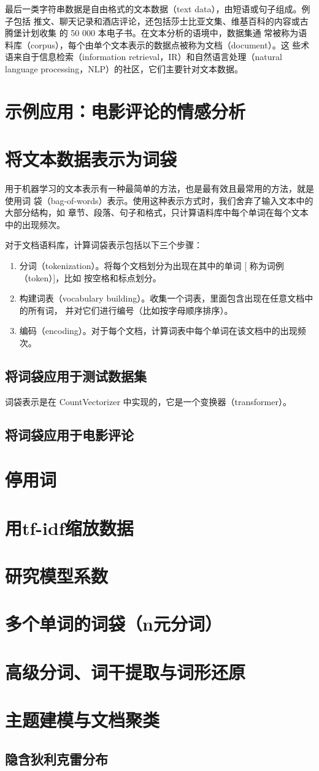最后一类字符串数据是自由格式的文本数据（text data），由短语或句子组成。例子包括
推文、聊天记录和酒店评论，还包括莎士比亚文集、维基百科的内容或古腾堡计划收集
的 50 000 本电子书。在文本分析的语境中，数据集通
常被称为语料库（corpus），每个由单个文本表示的数据点被称为文档（document）。这
些术语来自于信息检索（information retrieval，IR）和自然语言处理（natural language
processing，NLP）的社区，它们主要针对文本数据。
\section{示例应用：电影评论的情感分析}
\section{将文本数据表示为词袋}
用于机器学习的文本表示有一种最简单的方法，也是最有效且最常用的方法，就是使用词
袋（bag-of-words）表示。使用这种表示方式时，我们舍弃了输入文本中的大部分结构，如
章节、段落、句子和格式，只计算语料库中每个单词在每个文本中的出现频次。

对于文档语料库，计算词袋表示包括以下三个步骤：
\begin{enumerate}
    \item 分词（tokenization）。将每个文档划分为出现在其中的单词 [ 称为词例（token）]，比如
          按空格和标点划分。
    \item 构建词表（vocabulary building）。收集一个词表，里面包含出现在任意文档中的所有词，
          并对它们进行编号（比如按字母顺序排序）。
    \item 编码（encoding）。对于每个文档，计算词表中每个单词在该文档中的出现频次。
\end{enumerate}
\subsection{将词袋应用于测试数据集}
词袋表示是在 CountVectorizer 中实现的，它是一个变换器（transformer）。
\subsection{将词袋应用于电影评论}
\section{停用词}
\section{用tf-idf缩放数据}
\section{研究模型系数}
\section{多个单词的词袋（n元分词）}
\section{高级分词、词干提取与词形还原}
\section{主题建模与文档聚类}
\subsection{隐含狄利克雷分布}